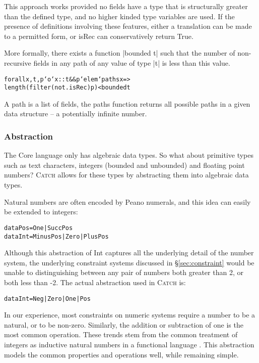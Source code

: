 \documentclass[preprint]{sigplanconf}
\newcommand{\C}[1]{\textsf{#1}}
\newcommand{\catch}{\textsc{Catch}}
\newenvironment{code}{\begin{alltt}\small}{\end{alltt}}
\begin{document}
This approach works provided no fields have a type that is structurally greater than the defined type, and no higher kinded type variables are used. If the presence of definitions involving these features, either a translation can be made to a permitted form, or \C{isRec} can conservatively return True.

More formally, there exists a function |bounded t| such that the number of non-recursive fields in any path of any value of type |t| is less than this value.

\begin{code}
forall x,t,p `o`  x :: t && p `elem` paths x =>
                  length (filter (not . isRec) p) < bounded t
\end{code}

A path is a list of fields, the \C{paths} function returns all possible paths in a given data structure -- a potentially infinite number.

\subsubsection{Abstraction}

The Core language only has algebraic data types. So what about primitive types such as text characters, integers (bounded and unbounded) and floating point numbers? \catch{} allows for these types by abstracting them into algebraic data types.

Natural numbers are often encoded by Peano numerals, and this idea can easily be extended to integers:

\begin{code}
data Pos  = One | Succ Pos
data Int  = Minus Pos | Zero | Plus Pos
\end{code}

Although this abstraction of \C{Int} captures all the underlying detail of the number system, the underlying constraint systems discussed in \S\ref{sec:constraint} would be unable to distinguishing between any pair of numbers both greater than 2, or both less than -2. The actual abstraction used in \catch{} is:

\begin{code}
data Int = Neg | Zero | One | Pos
\end{code}

In our experience, most constraints on numeric systems require a number to be a natural, or to be non-zero. Similarly, the addition or subtraction of one is the most common operation. These trends stem from the common treatment of integers as inductive natural numbers in a functional language \citep{runciman:naturals}. This abstraction models the common properties and operations well, while remaining simple.
\end{document}

